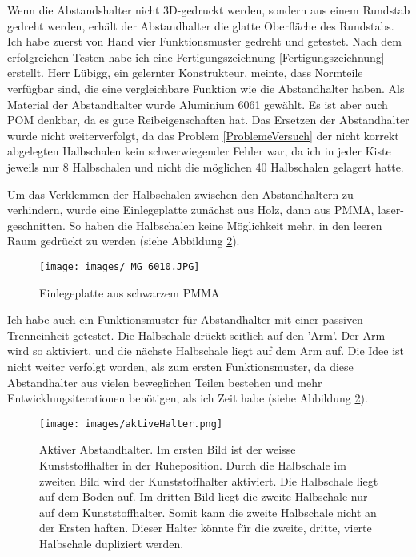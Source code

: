 Wenn die Abstandshalter nicht 3D-gedruckt werden, sondern aus einem Rundstab gedreht werden, erhält der Abstandhalter die glatte Oberfläche des Rundstabs. Ich habe zuerst von Hand vier Funktionsmuster gedreht und getestet. Nach dem erfolgreichen Testen habe ich eine Fertigungszeichnung \ref{Fertigungszeichnung} erstellt. Herr Lübigg, ein gelernter Konstrukteur, meinte, dass Normteile verfügbar sind, die eine vergleichbare Funktion wie die Abstandhalter haben. Als Material der Abstandhalter wurde Aluminium 6061 gewählt. Es ist aber auch POM denkbar, da es gute Reibeigenschaften hat. Das Ersetzen der Abstandhalter wurde nicht weiterverfolgt, da das Problem \ref{ProblemeVersuch} der nicht korrekt abgelegten Halbschalen kein schwerwiegender Fehler war, da ich in jeder Kiste jeweils nur 8 Halbschalen und nicht die möglichen 40 Halbschalen gelagert hatte.

Um das Verklemmen der Halbschalen zwischen den Abstandhaltern zu verhindern, wurde eine Einlegeplatte zunächst aus Holz, dann aus PMMA, laser-geschnitten. So haben die Halbschalen keine Möglichkeit mehr, in den leeren Raum gedrückt zu werden (siehe Abbildung \ref{fig:ProbLsg}).
\begin{figure}
   
  \texttt{[image: images/\_MG\_6010.JPG]}
  \caption{Einlegeplatte aus schwarzem PMMA}
  \label{fig:ProbLsg}
\end{figure}


Ich habe auch ein Funktionsmuster für Abstandhalter mit einer passiven Trenneinheit getestet. Die Halbschale drückt seitlich auf den 'Arm'. Der Arm wird so aktiviert, und die nächste Halbschale liegt auf dem Arm auf. Die Idee ist nicht weiter verfolgt worden, als zum ersten Funktionsmuster, da diese Abstandhalter aus vielen beweglichen Teilen bestehen und mehr Entwicklungsiterationen benötigen, als ich Zeit habe (siehe Abbildung \ref{fig:ProbLsg}).

\begin{figure}
   
  \texttt{[image: images/aktiveHalter.png]}
  \caption{Aktiver Abstandhalter. Im ersten Bild ist der weisse Kunststoffhalter in der Ruheposition. Durch die Halbschale im zweiten Bild wird der Kunststoffhalter aktiviert. Die Halbschale liegt auf dem Boden auf. Im dritten Bild liegt die zweite Halbschale nur auf dem Kunststoffhalter. Somit kann die zweite Halbschale nicht an der Ersten haften. Dieser Halter könnte für die zweite, dritte, vierte Halbschale dupliziert werden.}
  \label{fig:ProbLsg}
\end{figure}


